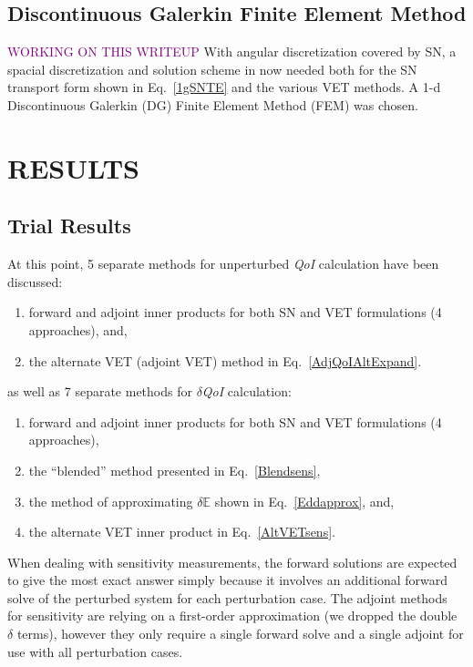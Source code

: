 \documentclass[12pt]{report}
\newcommand{\Edd}{\mathbb{E}}
\newcommand{\qoi}{{\it QoI}\xspace}
\newcommand{\comment}[2]{\marginpar{\textcolor{#2}{$\star$}}\textcolor{#2}{#1}\newline}
\newcommand{\todo}[1]{\comment{#1}{purple}}
\newcommand{\todo}[1]{\phantom{a}}
\begin{document}
\section{Discontinuous Galerkin Finite Element Method}
\todo{WORKING ON THIS WRITEUP}
With angular discretization covered by SN, a spacial discretization and solution scheme in now needed both for the SN transport form shown in Eq.~\eqref{1gSNTE} and the various VET methods. A 1-d Discontinuous Galerkin (DG) Finite Element Method (FEM) was chosen. 

\chapter{\uppercase {Results}}

\section{Trial Results}

At this point, 5 separate methods for unperturbed \qoi calculation have been discussed: 
\begin{enumerate}
\item forward and adjoint inner products for both SN and VET formulations (4 approaches), and,
\item the alternate VET (adjoint VET) method in Eq.~\eqref{AdjQoIAltExpand}.
\end{enumerate} 
as well as 7 separate methods for $\delta$\qoi calculation: 
\begin{enumerate}
\item forward and adjoint inner products for both SN and VET formulations (4 approaches),
\item the ``blended'' method presented in Eq.~\eqref{Blendsens},
\item the method of approximating $\delta \Edd$ shown in Eq.~\eqref{Eddapprox}, and,
\item the alternate VET inner product in  Eq.~\eqref{AltVETsens}.
\end{enumerate} 

When dealing with sensitivity measurements, the forward solutions are expected to give the most exact answer simply because it involves an additional forward solve of the perturbed system for each perturbation case. The adjoint methods for sensitivity are relying on a first-order approximation (we dropped the double $\delta$ terms), however they only require a single forward solve and a single adjoint for use with all perturbation cases. 
\end{document}
